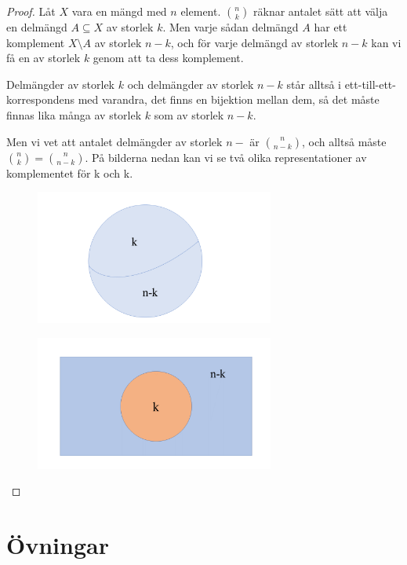 \documentclass{tufte-handout}
\begin{document}
\begin{proof}
	Låt $X$ vara en mängd med $n$ element. $\binom{n}{k}$ räknar antalet sätt att välja en delmängd $A \subseteq X$ av storlek $k$. Men varje sådan delmängd $A$ har ett komplement $X\setminus A$ av storlek $n-k$, och för varje delmängd av storlek $n-k$ kan vi få en av storlek $k$ genom att ta dess komplement.

	Delmängder av storlek $k$ och delmängder av storlek $n-k$ står alltså i ett-till-ett-korrespondens med varandra, det finns en bijektion mellan dem, så det måste finnas lika många av storlek $k$ som av storlek $n-k$.

	Men vi vet att antalet delmängder av storlek $n-$ är $\binom{n}{n-k}$, och alltså måste $\binom{n}{k} = \binom{n}{n-k}$.
 På bilderna nedan kan vi se två olika representationer av komplementet för k och k. 
\begin{figure}[h]
\includegraphics[width=0.7\textwidth]{graphics/komplementbild1.png}

\end{figure}

\begin{figure}[h]
\includegraphics[width=0.7\textwidth]{graphics/komplementbild2.png}

\end{figure}
\end{proof}




\section{Övningar}
\end{document}
